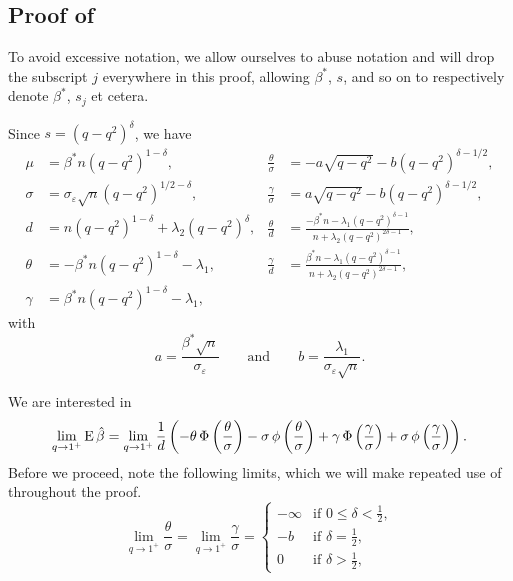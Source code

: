 \subsection{Proof of }\label{sec:classbalance-bias-proof}

To avoid excessive notation, we allow ourselves to abuse notation and will drop the
subscript \(j\) everywhere in this proof, allowing \(\beta^*\), \(s\), and so on to
respectively denote \(\beta^*\), \(s_j\) et cetera.

Since \(s = (q - q^2)^\delta\), we have
\begin{align*}
  \mu    & = \beta^* n (q - q^2)^{1 - \delta},                      & \frac{\theta}{\sigma} & = -a \sqrt{q - q^2} - b (q - q^2)^{\delta - 1/2},                                          \\
  \sigma & = \sigma_\varepsilon \sqrt{n} (q - q^2)^{1/2 - \delta},  & \frac{\gamma}{\sigma} & = a \sqrt{q - q^2} - b (q - q^2)^{\delta - 1/2},                                           \\
  d      & = n (q - q^2)^{1 - \delta} + \lambda_2 (q - q^2)^\delta, & \frac{\theta}{d}      & = \frac{-\beta^*n - \lambda_1 (q - q^2)^{\delta - 1}}{n + \lambda_2(q-q^2)^{2\delta - 1}}, \\
  \theta & = -\beta^* n (q - q^2)^{1-\delta} - \lambda_1,           & \frac{\gamma}{d}      & = \frac{\beta^*n - \lambda_1 (q - q^2)^{\delta - 1}}{n + \lambda_2(q-q^2)^{2\delta - 1}},  \\
  \gamma & = \beta^* n (q - q^2)^{1-\delta} - \lambda_1,
\end{align*}
with
\[
  a = \frac{\beta^* \sqrt{n}}{\sigma_\varepsilon} \qquad \text{and} \qquad b = \frac{\lambda_1}{\sigma_\varepsilon \sqrt{n}}.
\]

We are interested in
\begin{equation}
  \label{eq:eval-qlimit}
  \lim_{q \rightarrow 1^+} \operatorname{E} \hat{\beta} =\lim_{q \rightarrow 1^+}\frac{1}{d}\left(-\theta \operatorname{\Phi}\left(\frac{\theta}{\sigma}\right) - \sigma \operatorname{\phi}\left(\frac{\theta}{\sigma}\right) + \gamma \operatorname{\Phi}\left(\frac{\gamma}{\sigma}\right) + \sigma \operatorname{\phi}\left(\frac{\gamma}{\sigma}\right)\right).
\end{equation}
Before we proceed, note the following limits, which we will make repeated use of throughout the proof.
\begin{equation}
  \label{eq:eval-sigma-limits}
  \lim_{q \rightarrow 1^+} \frac{\theta}{\sigma} = \lim_{q \rightarrow 1^+} \frac{\gamma}{\sigma} =
  \begin{cases}
    -\infty & \text{if } 0 \leq \delta < \frac{1}{2}, \\
    -b      & \text{if } \delta = \frac{1}{2},        \\
    0       & \text{if } \delta > \frac{1}{2},
  \end{cases}
\end{equation}

